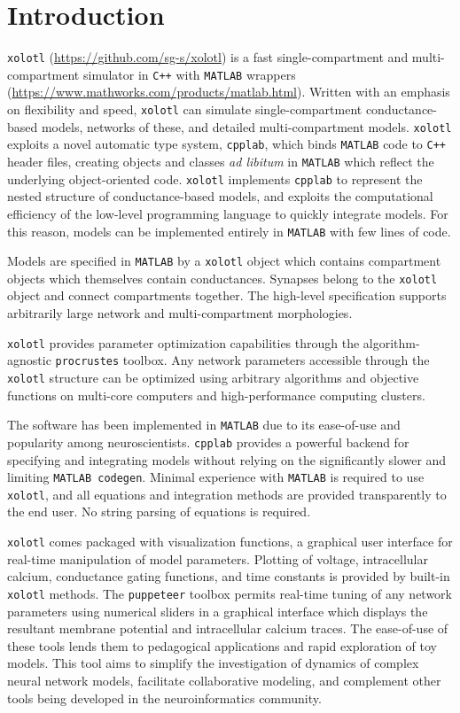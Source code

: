 \documentclass[utf8]{frontiersSCNS} %
\begin{document}
\section{Introduction}

\texttt{xolotl} (\url{https://github.com/sg-s/xolotl}) is a fast single-compartment and multi-compartment simulator in \texttt{C++} with \texttt{MATLAB} wrappers (\url{https://www.mathworks.com/products/matlab.html}). Written with an emphasis on flexibility and speed, \texttt{xolotl} can simulate single-compartment conductance-based models, networks of these, and detailed multi-compartment models. \texttt{xolotl} exploits a novel automatic type system, \texttt{cpplab}, which binds \texttt{MATLAB} code to \texttt{C++} header files, creating objects and classes \textit{ad libitum} in \texttt{MATLAB} which reflect the underlying object-oriented code. \texttt{xolotl} implements \texttt{cpplab} to represent the nested structure of conductance-based models, and exploits the computational efficiency of the low-level programming language to quickly integrate models. For this reason, models can be implemented entirely in \texttt{MATLAB} with few lines of code.

Models are specified in \texttt{MATLAB} by a \texttt{xolotl} object which contains compartment objects which themselves contain conductances. Synapses belong to the \texttt{xolotl} object and connect compartments together. The high-level specification supports arbitrarily large network and multi-compartment morphologies. 

\texttt{xolotl} provides parameter optimization capabilities through the algorithm-agnostic \texttt{procrustes} toolbox. Any network parameters accessible through the \texttt{xolotl} structure can be optimized using arbitrary algorithms and objective functions on multi-core computers and high-performance computing clusters.

The software has been implemented in \texttt{MATLAB} due to its ease-of-use and popularity among neuroscientists. \texttt{cpplab} provides a powerful backend for specifying and integrating models without relying on the significantly slower and limiting \texttt{MATLAB codegen}. Minimal experience with \texttt{MATLAB} is required to use \texttt{xolotl}, and all equations and integration methods are provided transparently to the end user. No string parsing of equations is required. 

\texttt{xolotl} comes packaged with visualization functions, a graphical user interface for real-time manipulation of model parameters. Plotting of voltage, intracellular calcium, conductance gating functions, and time constants is provided by built-in \texttt{xolotl} methods. The \texttt{puppeteer} toolbox permits real-time tuning of any network parameters using numerical sliders in a graphical interface which displays the resultant membrane potential and intracellular calcium traces. The ease-of-use of these tools lends them to pedagogical applications and rapid exploration of toy models. This tool aims to simplify the investigation of dynamics of complex neural network models, facilitate collaborative modeling, and complement other tools being developed in the neuroinformatics community.
\end{document}

